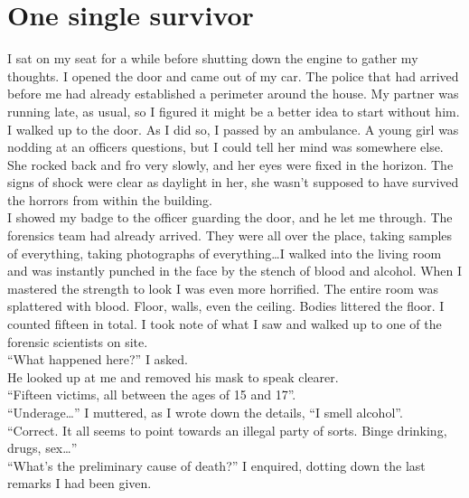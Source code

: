 \documentclass[a4paper,onecolumn,11pt]{article}
\begin{document}

\section{One single survivor}

I sat on my seat for a while before shutting down the engine to gather my thoughts. I opened the door and came out of my car. The police that had arrived before me had already established a perimeter around the house. My partner was running late, as usual, so I figured it might be a better idea to start without him. I walked up to the door. As I did so, I passed by an ambulance. A young girl was nodding at an officers questions, but I could tell her mind was somewhere else. She rocked back and fro very slowly, and her eyes were fixed in the horizon. The signs of shock were clear as daylight in her, she wasn’t supposed to have survived the horrors from within the building.\\
\newline
I showed my badge to the officer guarding the door, and he let me through. The forensics team had already arrived. They were all over the place, taking samples of everything, taking photographs of everything\ldots I walked into the living room and was instantly punched in the face by the stench of blood and alcohol. When I mastered the strength to look I was even more horrified. The entire room was splattered with blood. Floor, walls, even the ceiling. Bodies littered the floor. I counted fifteen in total. I took note of what I saw and walked up to one of the forensic scientists on site.\\
\newline
``What happened here?'' I asked.\\
He looked up at me and removed his mask to speak clearer.\\
``Fifteen victims, all between the ages of 15 and 17''.\\
``Underage\ldots'' I muttered, as I wrote down the details, ``I smell alcohol''.\\
``Correct. It all seems to point towards an illegal party of sorts. Binge drinking, drugs, sex\ldots''\\
``What's the preliminary cause of death?'' I enquired, dotting down the last remarks I had been given.\\
\end{document}
